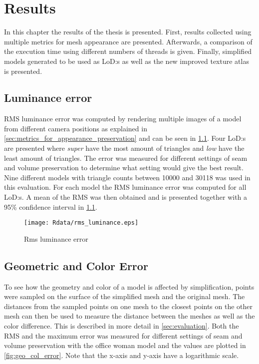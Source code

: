 

\chapter{Results} \label{cha:results}
In this chapter the results of the thesis is presented. First, results collected using multiple metrics for mesh appearance are presented. Afterwards, a comparison of the execution time using different numbers of threads is given. Finally, simplified models generated to be used as LoD:s as well as the new improved texture atlas is presented.

\section{Luminance error}
RMS luminance error was computed by rendering multiple images of a model from different camera positions as explained in \cref{sec:metrics_for_appearance_preservation} and can be seen in \cref{fig:mean_luminance_error}. Four LoD:s are presented where \emph{super} have the most amount of triangles and \emph{low} have the least amount of triangles. The error was measured for different settings of seam and volume preservation to determine what setting would give the best result. Nine different models with triangle counts between 10000 and 30118 was used in this evaluation. For each model the RMS luminance error was computed for all LoD:s. A mean of the RMS was then obtained and is presented together with a 95\% confidence interval in \cref{fig:mean_luminance_error}.

\begin{figure}[h]
  \centering
  \texttt{[image: Rdata/rms\_luminance.eps]}
  \caption{Rms luminance error}
  \label{fig:mean_luminance_error}
\end{figure}

\clearpage

\section{Geometric and Color Error}
To see how the geometry and color of a model is affected by simplification, points were sampled on the surface of the simplified mesh and the original mesh. The distances from the sampled points on one mesh to the closest points on the other mesh can then be used to measure the distance between the meshes as well as the color difference. This is described in more detail in \cref{sec:evaluation}. Both the RMS and the maximum error was measured for different settings of seam and volume preservation with the office woman model and the values are plotted in \cref{fig:geo_col_error}. Note that the x-axis and y-axis have a logarithmic scale.

